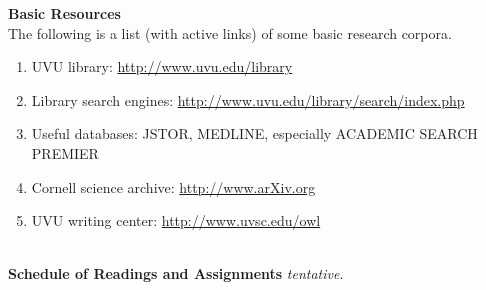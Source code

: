 \documentclass[11pt]{article}
\begin{document}
  
  {\bf Basic Resources}\\
  The following is a list (with active links) of some basic research corpora.
  \begin{enumerate}
\item UVU library: \href{http://www.uvu.edu/library}{http://www.uvu.edu/library}
\item Library search engines: \href{http://www.uvu.edu/library/search/index.php}{http://www.uvu.edu/library/search/index.php}
\item Useful databases: JSTOR, MEDLINE, especially ACADEMIC SEARCH PREMIER
\item Cornell science archive: \href{http://www.arXiv.org}{http://www.arXiv.org}
\item UVU writing center: \href{http://www.uvsc.edu/owl}{http://www.uvsc.edu/owl}
\end{enumerate}
\ \\
% 
\newpage
   {\bf  Schedule of Readings and Assignments} {\it tentative}.
\end{document}
